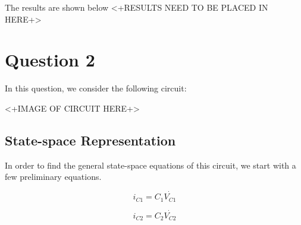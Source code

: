\documentclass[a4paper, 12pt]{article}
\begin{document}









The results are shown below <+RESULTS NEED TO BE PLACED IN HERE+>





\section{Question 2}

In this question, we consider the following circuit:

<+IMAGE OF CIRCUIT HERE+>

\subsection{State-space Representation}

In order to find the general state-space equations of this circuit, we start
with a few preliminary equations.

\begin{equation}
  i_{C1} = C_1 \dot{V_{C1}}
  \label{eq:ic1}
\end{equation}

\begin{equation}
  i_{C2} = C_2 \dot{V_{C2}}
  \label{eq:ic2}
\end{equation}
\end{document}
